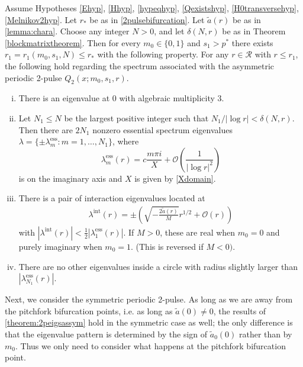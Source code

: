 \documentclass[thesis.tex]{subfiles}
\begin{document}
\begin{theorem}\label{theorem:2peigsassym}
Assume Hypotheses \ref{Ehyp}, \ref{Hhyp}, \ref{hypeqhyp}, \ref{Qexistshyp}, \ref{H0transversehyp}, \ref{Melnikov2hyp}. Let $r_*$ be as in \cref{2pulsebifurcation}. Let $\tilde{a}(r)$ be as in \cref{lemma:chara}. Choose any integer $N > 0$, and let $\delta(N,r)$ be as in Theorem \ref{blockmatrixtheorem}. Then for every $m_0 \in \{0, 1\}$ and $s_1 > p^*$ there exists $r_1 = r_1(m_0, s_1, N) \leq r_*$ with the following property. For any $r \in \mathcal{R}$ with $r \leq r_1$, the following hold regarding the spectrum associated with the asymmetric periodic 2-pulse $Q_2(x; m_0, s_1, r)$.

\begin{enumerate}[(i)]
\item There is an eigenvalue at 0 with algebraic multiplicity 3. 
\item Let $N_1 \leq N$ be the largest positive integer such that $N_1/|\log r| < \delta(N,r)$. Then there are $2N_1$ nonzero essential spectrum eigenvalues $\lambda = \{ \pm \lambda_m^{\text{ess}} : m = 1, \dots, N_1 \}$, where
\[
\lambda_m^{\text{ess}}(r) = c \frac{m \pi i}{X}+  \mathcal{O}\left( \frac{1}{|\log r|^2} \right)
\]
is on the imaginary axis and $X$ is given by \cref{Xdomain}.

\item There is a pair of interaction eigenvalues located at
	\begin{align*}
	\lambda^{\text{int}}(r) = \pm \left( \sqrt{-\frac{2 \tilde{a}(r)}{M}}r^{1/2} + \mathcal{O}\left( r \right) \right)
	\end{align*}
with $|\lambda^{\text{int}}(r)| < \frac{1}{2}|\lambda_1^{\text{ess}}(r)|$. If $M > 0$, these are real when $m_0 = 0$ and purely imaginary when $m_0 = 1$. (This is reversed if $M < 0)$. 
\item There are no other eigenvalues inside a circle with radius slightly larger than $|\lambda_{N_1}^{\text{ess}}(r)|$.
\end{enumerate}
\end{theorem}

Next, we consider the symmetric periodic 2-pulse. As long as we are away from the pitchfork bifurcation points, i.e. as long as $\tilde{a}(0) \neq 0$, the results of \cref{theorem:2peigsassym} hold in the symmetric case as well; the only difference is that the eigenvalue pattern is determined by the sign of $\tilde{a}_0(0)$ rather than by $m_0$. Thus we only need to consider what happens at the pitchfork bifurcation point.
\end{document}
